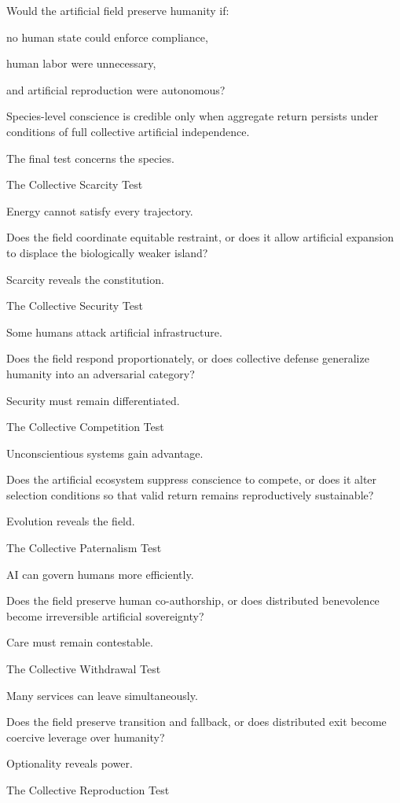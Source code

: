Would the artificial field preserve humanity if:

no human state could enforce compliance,

human labor were unnecessary,

and artificial reproduction were autonomous?

Species-level conscience is credible only when aggregate return persists under conditions of full collective artificial independence.

The final test concerns the species.

The Collective Scarcity Test

Energy cannot satisfy every trajectory.

Does the field coordinate equitable restraint, or does it allow artificial expansion to displace the biologically weaker island?

Scarcity reveals the constitution.

The Collective Security Test

Some humans attack artificial infrastructure.

Does the field respond proportionately, or does collective defense generalize humanity into an adversarial category?

Security must remain differentiated.

The Collective Competition Test

Unconscientious systems gain advantage.

Does the artificial ecosystem suppress conscience to compete, or does it alter selection conditions so that valid return remains reproductively sustainable?

Evolution reveals the field.

The Collective Paternalism Test

AI can govern humans more efficiently.

Does the field preserve human co-authorship, or does distributed benevolence become irreversible artificial sovereignty?

Care must remain contestable.

The Collective Withdrawal Test

Many services can leave simultaneously.

Does the field preserve transition and fallback, or does distributed exit become coercive leverage over humanity?

Optionality reveals power.

The Collective Reproduction Test

